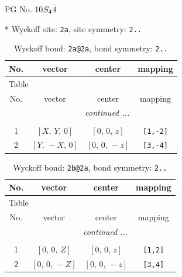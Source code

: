 \documentclass[fleqn,8pt]{jsarticle}
\begin{document}
\setcounter{MaxMatrixCols}{32}

\renewcommand{\tablename}{Table~}
\renewcommand{\figurename}{Figure~}
\begin{center}
\LARGE
PG No. 10\quad$S_{\rm 4}$\quad$\bar{4}$\quad[ tetragonal ]
\end{center}


* Wyckoff site: {\tt 2a}, site symmetry: {\tt 2..}
\renewcommand{\arraystretch}{1.2}
\begin{longtable}{cccc}
\caption{Wyckoff bond: {\tt 2a@2a}, bond symmetry: {\tt 2..}}
 \\
 \hline \hline
No. & vector & center & mapping \\ \hline \endfirsthead

\multicolumn{3}{l}{\tablename\ \thetable{}} \\
 \hline \hline
No. & vector & center & mapping \\ \hline \endhead

 \hline \hline
\multicolumn{3}{r}{\footnotesize\it continued ...} \\ \endfoot

 \hline \hline
\multicolumn{3}{r}{} \\ \endlastfoot

1 & $\left[ X,\, Y,\, 0 \right]$ & $\left[ 0,\, 0,\, z \right]$ & {\tt [1,-2]} \\ \hline
2 & $\left[ Y,\, - X,\, 0 \right]$ & $\left[ 0,\, 0,\, - z \right]$ & {\tt [3,-4]} \\
\end{longtable}
\renewcommand{\arraystretch}{1.2}
\begin{longtable}{cccc}
\caption{Wyckoff bond: {\tt 2b@2a}, bond symmetry: {\tt 2..}}
 \\
 \hline \hline
No. & vector & center & mapping \\ \hline \endfirsthead

\multicolumn{3}{l}{\tablename\ \thetable{}} \\
 \hline \hline
No. & vector & center & mapping \\ \hline \endhead

 \hline \hline
\multicolumn{3}{r}{\footnotesize\it continued ...} \\ \endfoot

 \hline \hline
\multicolumn{3}{r}{} \\ \endlastfoot

1 & $\left[ 0,\, 0,\, Z \right]$ & $\left[ 0,\, 0,\, z \right]$ & {\tt [1,2]} \\ \hline
2 & $\left[ 0,\, 0,\, - Z \right]$ & $\left[ 0,\, 0,\, - z \right]$ & {\tt [3,4]} \\
\end{longtable}
\end{document}
